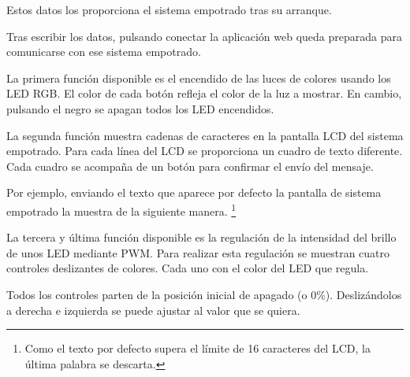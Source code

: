 
Estos datos los proporciona el sistema empotrado tras su arranque. 


Tras escribir los datos, pulsando conectar la aplicación web queda preparada
para comunicarse con ese sistema empotrado.


La primera función disponible es el encendido de las luces de colores usando
los LED RGB. El color de cada botón refleja el color de la luz a mostrar.
En cambio, pulsando el negro se apagan todos los LED encendidos.


La segunda función muestra cadenas de caracteres en la pantalla LCD del sistema
empotrado. Para cada línea del LCD se proporciona un cuadro de texto diferente.
Cada cuadro se acompaña de un botón para confirmar el envío del mensaje.


Por ejemplo, enviando el texto que aparece por defecto la pantalla de sistema
empotrado la muestra de la siguiente manera. \footnote{Como el texto por defecto
supera el límite de 16 caracteres del LCD, la última palabra se descarta.}


La tercera y última función disponible es la regulación de la intensidad del
brillo de unos LED mediante PWM. Para realizar esta regulación se muestran 
cuatro controles deslizantes de colores. Cada uno con el color del LED que
regula.


Todos los controles parten de la posición inicial de apagado (o 0\%).
Deslizándolos a derecha e izquierda se puede ajustar al valor que se quiera.

